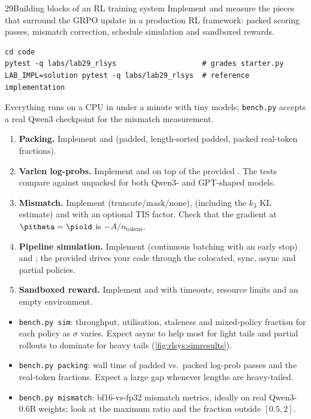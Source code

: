 \begin{labbox}{29}{Building blocks of an RL training system}
Implement and measure the pieces that surround the GRPO update in a production RL framework:
packed scoring passes, mismatch correction, schedule simulation and sandboxed rewards.

\begin{lstlisting}[style=shell]
cd code
pytest -q labs/lab29_rlsys                    # grades starter.py
LAB_IMPL=solution pytest -q labs/lab29_rlsys  # reference implementation
\end{lstlisting}
Everything runs on a CPU in under a minute with tiny models; \texttt{bench.py} accepts a real
Qwen3 checkpoint for the mismatch measurement.

\begin{enumerate}
\item \textbf{Packing.} Implement  and  (padded,
length-sorted padded, packed real-token fractions).
\item \textbf{Varlen log-probs.} Implement  and
 on top of the provided . The tests
compare against unpacked  for both Qwen3- and GPT-shaped models.
\item \textbf{Mismatch.} Implement  (truncate/mask/none),
 (including the $k_3$ KL estimate) and  with an
optional TIS factor. Check that the gradient at $\pitheta=\piold$ is $-A/n_{\text{tokens}}$.
\item \textbf{Pipeline simulation.} Implement  (continuous batching with
an early stop) and ; the provided  drives your code
through the colocated, sync, async and partial policies.
\item \textbf{Sandboxed reward.} Implement  and 
with timeouts, resource limits and an empty environment.
\end{enumerate}

\begin{itemize}
\item \texttt{bench.py sim}: throughput, utilisation, staleness and mixed-policy fraction for
each policy as $\sigma$ varies. Expect async to help most for light tails and partial rollouts
to dominate for heavy tails (\cref{fig:rlsys:simresults}).
\item \texttt{bench.py packing}: wall time of padded vs.\ packed log-prob passes and the
real-token fractions. Expect a large gap whenever lengths are heavy-tailed.
\item \texttt{bench.py mismatch}: bf16-vs-fp32 mismatch metrics, ideally on real Qwen3-0.6B
weights; look at the maximum ratio and the fraction outside $[0.5, 2]$.
\end{itemize}


\end{labbox}
